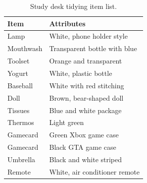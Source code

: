 \documentclass[sigconf,authordraft]{acmart}
\begin{document}
\begin{table}[h]
\centering
\begin{tabular}{ll}
\toprule
\textbf{Item} & \textbf{Attributes} \\
\midrule
Lamp & White, phone holder style \\
Mouthwash & Transparent bottle with blue \\
Toolset & Orange and transparent \\
Yogurt & White, plastic bottle \\
Baseball & White with red stitching \\
Doll & Brown, bear-shaped doll \\
Tissues & Blue and white package \\
Thermos & Light green \\
Gamecard & Green Xbox game case \\
Gamecard & Black GTA game case \\
Umbrella & Black and white striped \\
Remote & White, air conditioner remote \\
\bottomrule
\end{tabular}
\caption{Study desk tidying item list.}
\end{table}
\end{document}
